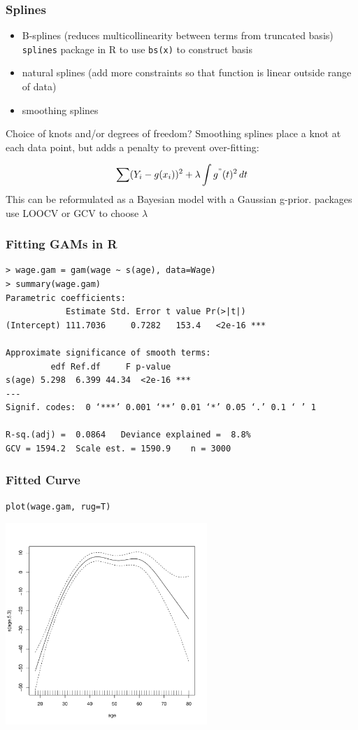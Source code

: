 \documentclass[]{beamer}\usepackage[]{graphicx}\usepackage[]{color}
\begin{document}
\begin{frame}\frametitle{Splines}

  \begin{itemize}
  \item B-splines  (reduces multicollinearity between terms from
    truncated basis) {\tt splines} package in R to use {\tt bs(x)} to
    construct basis \pause
  \item natural splines   (add more constraints so that function is linear
    outside range of data) \pause
\item smoothing splines \pause
  \end{itemize}

Choice of knots and/or degrees of freedom? \pause   Smoothing splines place
a knot at each data point, but adds
 a penalty to prevent over-fitting:

$$ \sum (Y_i - g(x_i))^2 +  \lambda \int g^{"}(t)^2 \, dt $$
\pause
This can be reformulated as a Bayesian model with a Gaussian g-prior.
packages use LOOCV or GCV to choose $\lambda$
\end{frame}

\begin{frame}[fragile]\frametitle{Fitting GAMs in R}
\begin{verbatim}
> wage.gam = gam(wage ~ s(age), data=Wage)
> summary(wage.gam)
Parametric coefficients:
            Estimate Std. Error t value Pr(>|t|)
(Intercept) 111.7036     0.7282   153.4   <2e-16 ***

Approximate significance of smooth terms:
         edf Ref.df     F p-value
s(age) 5.298  6.399 44.34  <2e-16 ***
---
Signif. codes:  0 ‘***’ 0.001 ‘**’ 0.01 ‘*’ 0.05 ‘.’ 0.1 ‘ ’ 1

R-sq.(adj) =  0.0864   Deviance explained =  8.8%
GCV = 1594.2  Scale est. = 1590.9    n = 3000
\end{verbatim}
\end{frame}
\begin{frame}\frametitle{Fitted Curve}
{\tt  plot(wage.gam, rug=T) }
\centerline{\includegraphics[height=3in]{gam-age}}
\end{frame}
\end{document}
